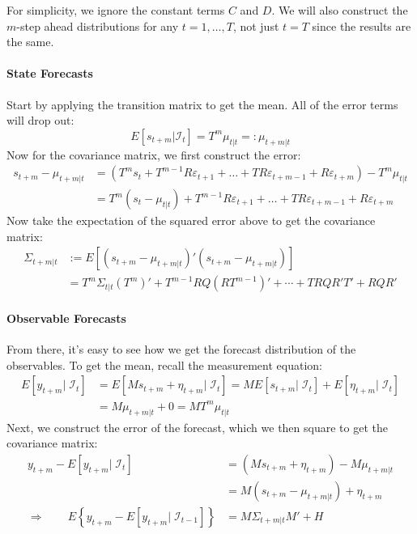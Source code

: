 \documentclass[a4paper,12pt]{article}
\begin{document}
For simplicity, we ignore the constant terms $C$ and $D$. We will also construct the $m$-step ahead distributions for any $t=1,\ldots,T$, not just $t=T$ since the results are the same.

\paragraph{State Forecasts} Start by applying the transition matrix to get the mean. All of the error terms will drop out:
\[
  E[s_{t+m} | \mathcal{I}_{t}] =
  T^m \mu_{t|t} =: \mu_{t+m|t}
\]
Now for the covariance matrix, we first construct the error:
\begin{align*}
  s_{t+m} - \mu_{t+m|t} &=
  \left(T^m s_t + T^{m-1} R\varepsilon_{t+1}
  + \ldots
  + TR\varepsilon_{t+m-1} + R\varepsilon_{t+m}\right)
  - T^m \mu_{t|t}\\
  &= T^m (s_t-\mu_{t|t}) + T^{m-1} R\varepsilon_{t+1}
  + \ldots
  + TR\varepsilon_{t+m-1} + R\varepsilon_{t+m}
\end{align*}
Now take the expectation of the squared error above to get the covariance matrix:
\begin{align*}
  \Sigma_{t+m|t} &:=
    E[(s_{t+m} - \mu_{t+m|t})'(s_{t+m} - \mu_{t+m|t})]\\
    &= T^m \Sigma_{t|t} (T^m)' + T^{m-1}RQ(RT^{m-1})'
      + \cdots + TRQR'T' + RQR'
\end{align*}

\paragraph{Observable Forecasts} From there, it's easy to see how we get the forecast distribution of the observables. To get the mean, recall the measurement equation:
\begin{align*}
  E[y_{t+m}|\;\mathcal{I}_{t}] &=
    E[Ms_{t+m} + \eta_{t+m}|\;\mathcal{I}_{t}]
    = ME[s_{t+m}|\;\mathcal{I}_{t}]
    + E[\eta_{t+m}|\;\mathcal{I}_{t}]\\
  &= M\mu_{t+m|t} + 0 = M T^m \mu_{t|t}
\end{align*}
Next, we construct the error of the forecast, which we then square to get the covariance matrix:
\begin{align*}
  y_{t+m} - E[y_{t+m}|\;\mathcal{I}_{t}] &=
    \left(Ms_{t+m} + \eta_{t+m}\right)
    - M\mu_{t+m|t}\\
  &= M\left(s_{t+m}-\mu_{t+m|t}\right) + \eta_{t+m}\\
  \Rightarrow\qquad
  E\left\{y_{t+m} - E[y_{t+m}|\;\mathcal{I}_{t-1}]
  \right\} &= M\Sigma_{t+m|t}M' + H
\end{align*}
\end{document}
